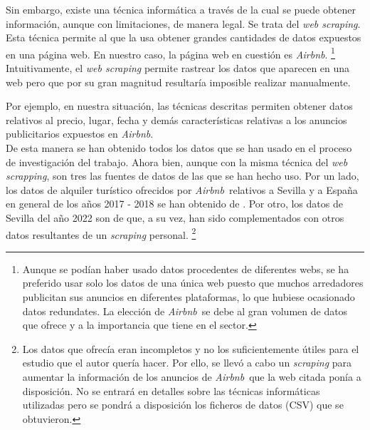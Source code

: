 \documentclass[a4paper,10pt]{article}
\newcommand*{\airbnb}{\textit{Airbnb}}
\newcommand*{\webscrapping}{\textit{web scrapping}}
\begin{document}
\begin{multicols}{2}
            \noindent
            Sin embargo, existe una técnica informática a través de la cual se puede obtener información, aunque con limitaciones, de manera legal.
            Se trata del \textit{web scraping}. Esta técnica permite al que la usa obtener grandes cantidades de datos expuestos en una página web.
            En nuestro caso, la página web en cuestión es \textit{Airbnb}. \footnote{Aunque se podían haber usado datos procedentes de diferentes webs, 
            se ha preferido usar solo los datos de una única web puesto que muchos arredadores publicitan sus anuncios en diferentes plataformas, lo que hubiese 
            ocasionado datos redundates. La elección de \airbnb \ se debe al gran volumen de datos que ofrece y a la importancia que tiene en el sector.} \\
           
            \noindent
            Intuitivamente, el \textit{web scraping} permite rastrear los datos que aparecen 
            en una web pero que por su gran magnitud resultaría imposible realizar manualmente. 
            \vfill\null
            
            \columnbreak
            \noindent
            Por ejemplo, en nuestra situación, las técnicas descritas 
            permiten obtener datos relativos al precio, lugar, fecha y demás características relativas a los anuncios publicitarios expuestos en \airbnb. \\
        
            \noindent
            De esta manera se han obtenido todos los datos que se han usado en el proceso de investigación del trabajo. Ahora bien, aunque con la misma técnica
            del \webscrapping, son tres las fuentes de datos de las que se han hecho uso. Por un lado, los datos de alquiler turístico ofrecidos por 
            \airbnb \  relativos a Sevilla y a España en general de los años 2017 - 2018 se han obtenido de \cite{datahippo}. Por otro, los datos 
            de Sevilla del año 2022 son de \cite{insideairbnb} que, a su vez, han sido complementados con otros datos resultantes de un \textit{scraping} personal.
            \footnote{Los datos que ofrecía \cite{insideairbnb} eran incompletos y no los suficientemente útiles para el estudio que el autor quería hacer. Por ello,
            se llevó a cabo un \textit{scraping} para aumentar la información de los anuncios de \airbnb \ que la web citada ponía a disposición. No se 
            entrará en detalles sobre las técnicas informáticas utilizadas pero se pondrá a disposición los ficheros de datos (CSV) que se obtuvieron.} 


\end{multicols}
\end{document}
